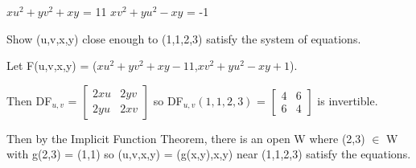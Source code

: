     \vspace{0.5cm}



    \begin{example}
        $xu^2 + yv^2 + xy$ = 11
        \hspace{1cm}
        $xv^2 + yu^2 - xy$ = -1

        Show (u,v,x,y) close enough to (1,1,2,3) satisfy the system of equations.
    \end{example}

    \begin{tbox}
        Let F(u,v,x,y) = ($xu^2 + yv^2 + xy - 11$,$xv^2 + yu^2 - xy + 1$).

        Then DF$_{u,v}$ =
        $\begin{bmatrix}
            2xu & 2yv \\
            2yu & 2xv
        \end{bmatrix}$
        so DF$_{u,v}(1,1,2,3)$ =
        $\begin{bmatrix}
            4 & 6 \\
            6 & 4
        \end{bmatrix}$ is invertible.

        Then by the Implicit Function Theorem, there is an open W where
        (2,3) $\in$ W with g(2,3) = (1,1)
        so (u,v,x,y) = (g(x,y),x,y) near (1,1,2,3)
        satisfy the equations. 
    \end{tbox}




    